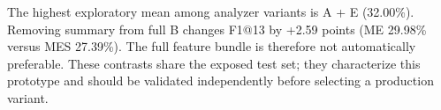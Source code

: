 The highest exploratory mean among analyzer variants is A + E (32.00\%). Removing summary from full B changes F1@13 by +2.59 points (ME 29.98\% versus MES 27.39\%). The full feature bundle is therefore not automatically preferable. These contrasts share the exposed test set; they characterize this prototype and should be validated independently before selecting a production variant.
